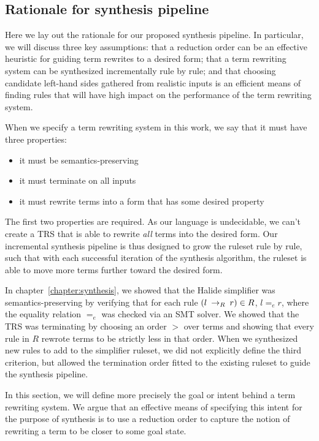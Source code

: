 \subsection{Rationale for synthesis pipeline}

Here we lay out the rationale for our proposed synthesis pipeline. In particular, we will discuss three key assumptions: that a reduction order can be an effective heuristic for guiding term rewrites to a desired form; that a term rewriting system can be synthesized incrementally rule by rule; and that choosing candidate left-hand sides gathered from realistic inputs is an efficient means of finding rules that will have high impact on the performance of the term rewriting system.

When we specify a term rewriting system in this work, we say that it must have three properties:

\begin{itemize}
    \item it must be semantics-preserving
    \item it must terminate on all inputs
    \item it must rewrite terms into a form that has some desired property
\end{itemize}

The first two properties are required. As our language is undecidable, we can't create a TRS that is able to rewrite \emph{all} terms into the desired form. Our incremental synthesis pipeline is thus designed to grow the ruleset rule by rule, such that with each successful iteration of the synthesis algorithm, the ruleset is able to move more terms further toward the desired form.

In chapter~\ref{chapter:synthesis}, we showed that the Halide simplifier was semantics-preserving by verifying that for each rule $(l \:\rightarrow_{R}\: r) \in R$, $l =_e r$, where the equality relation $=_e$ was checked via an SMT solver. We showed that the TRS was terminating by choosing an order $>$ over terms and showing that every rule in $R$ rewrote terms to be strictly less in that order. When we synthesized new rules to add to the simplifier ruleset, we did not explicitly define the third criterion, but allowed the termination order fitted to the existing ruleset to guide the synthesis pipeline. 

In this section, we will define more precisely the goal or intent behind a term rewriting system. We argue that an effective means of specifying this intent for the purpose of synthesis is to use a reduction order to capture the notion of rewriting a term to be closer to some goal state.

